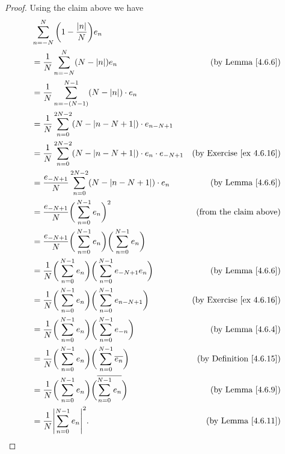 \begin{proof}
    Using the claim above we have
    \begin{align*}
         & \sum_{n = -N}^N \bigg(1 - \frac{\abs*{n}}{N}\bigg) e_n                                                                                    \\
         & = \frac{1}{N} \sum_{n = -N}^N (N - \abs*{n}) e_n                                                   & \text{(by Lemma \ref{4.6.6})}        \\
         & = \frac{1}{N} \sum_{n = -(N - 1)}^{N - 1} (N - \abs*{n}) \cdot e_n                                                                        \\
         & = \frac{1}{N} \sum_{n = 0}^{2N - 2} (N - \abs*{n - N + 1}) \cdot e_{n - N + 1}                                                            \\
         & = \frac{1}{N} \sum_{n = 0}^{2N - 2} (N - \abs*{n - N + 1}) \cdot e_n \cdot e_{-N + 1}              & \text{(by Exercise \ref{ex 4.6.16})} \\
         & = \frac{e_{-N + 1}}{N} \sum_{n = 0}^{2N - 2} (N - \abs*{n - N + 1}) \cdot e_n                      & \text{(by Lemma \ref{4.6.6})}        \\
         & = \frac{e_{-N + 1}}{N} \bigg(\sum_{n = 0}^{N - 1} e_n\bigg)^2                                      & \text{(from the claim above)}        \\
         & = \frac{e_{-N + 1}}{N} \bigg(\sum_{n = 0}^{N - 1} e_n\bigg) \bigg(\sum_{n = 0}^{N - 1} e_n\bigg)                                          \\
         & = \frac{1}{N} \bigg(\sum_{n = 0}^{N - 1} e_n\bigg) \bigg(\sum_{n = 0}^{N - 1} e_{-N + 1} e_n\bigg) & \text{(by Lemma \ref{4.6.6})}        \\
         & = \frac{1}{N} \bigg(\sum_{n = 0}^{N - 1} e_n\bigg) \bigg(\sum_{n = 0}^{N - 1} e_{n - N + 1}\bigg)  & \text{(by Exercise \ref{ex 4.6.16})} \\
         & = \frac{1}{N} \bigg(\sum_{n = 0}^{N - 1} e_n\bigg) \bigg(\sum_{n = 0}^{N - 1} e_{-n}\bigg)         & \text{(by Lemma \ref{4.6.4})}        \\
         & = \frac{1}{N} \bigg(\sum_{n = 0}^{N - 1} e_n\bigg) \bigg(\sum_{n = 0}^{N - 1} \overline{e_n}\bigg) & \text{(by Definition \ref{4.6.15})}  \\
         & = \frac{1}{N} \bigg(\sum_{n = 0}^{N - 1} e_n\bigg) \bigg(\overline{\sum_{n = 0}^{N - 1} e_n}\bigg) & \text{(by Lemma \ref{4.6.9})}        \\
         & = \frac{1}{N} \abs*{\sum_{n = 0}^{N - 1} e_n}^2.                                                   & \text{(by Lemma \ref{4.6.11})}
    \end{align*}
\end{proof}

